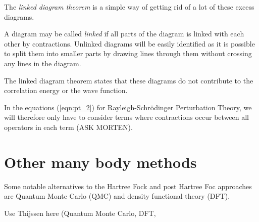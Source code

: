 The \emph{linked diagram theorem} is a simple way of getting rid of a lot of these excess diagrams.

A diagram may be called \emph{linked} if all parts of the diagram is linked with each other by contractions. Unlinked diagrams will be easily identified as it is possible to split them into smaller parts by drawing lines through them without crossing any lines in the diagram. 

The linked diagram theorem states that these diagrams do not contribute to the correlation energy or the wave function. 

In the equations (\ref{eqn:pt_2}) for Rayleigh-Schrödinger Perturbation Theory, we will therefore only have to consider terms where contractions occur between all operators in each term (ASK MORTEN). 

\section{Other many body methods}

Some notable alternatives to the Hartree Fock and post Hartree Foc approaches are Quantum Monte Carlo (QMC) and density functional theory (DFT). 



Use Thijssen here (Quantum Monte Carlo, DFT, 



